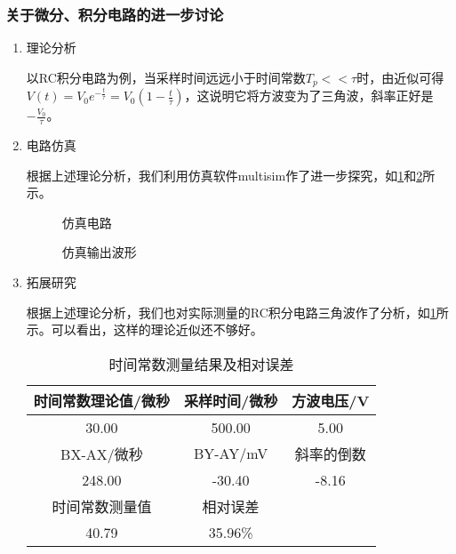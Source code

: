 \documentclass[dvipsnames, svgnames,a4paper,11pt]{article}
\begin{document}
	\subsubsection{关于微分、积分电路的进一步讨论}
	\begin{enumerate}
		\item 理论分析
		
		以RC积分电路为例，当采样时间远远小于时间常数$T_p<<\tau$时，由近似可得$V(t)=V_0e^{-\frac{t}{\tau}}=V_0(1-\frac{t}{\tau})$，这说明它将方波变为了三角波，斜率正好是$-\frac{V_0}{\tau}$。
		
		\item 电路仿真
		
		根据上述理论分析，我们利用仿真软件multisim作了进一步探究，如\cref{fig:figA1}和\cref{fig:figA3}所示。
		
		\begin{figure}[htbp]
			\centering
			\caption{仿真电路}
			\label{fig:figA1}			
		\end{figure}
		
		\begin{figure}[htbp]
			\centering
			\caption{仿真输出波形}
			\label{fig:figA3}			
		\end{figure}
		
		\item 拓展研究
		
		根据上述理论分析，我们也对实际测量的RC积分电路三角波作了分析，如\cref{tab:tab3}所示。可以看出，这样的理论近似还不够好。
		
		\begin{table}[h]
			\centering
			\caption{时间常数测量结果及相对误差}
			\label{tab:tab3}
			\begin{tabular}{|c|c|c|}
				\hline
				时间常数理论值/微秒 & 采样时间/微秒 & 方波电压/V\\
				\hline
				30.00 & 500.00 & 5.00\\
				\hline
				BX-AX/微秒 & BY-AY/mV & 斜率的倒数\\
				\hline
				248.00 & -30.40 & -8.16\\
				\hline
				时间常数测量值 & 相对误差 & \\
				\hline
				40.79 & 35.96\% & \\
				\hline
			\end{tabular}
		\end{table}
		
		
	\end{enumerate}
		
\end{document}
